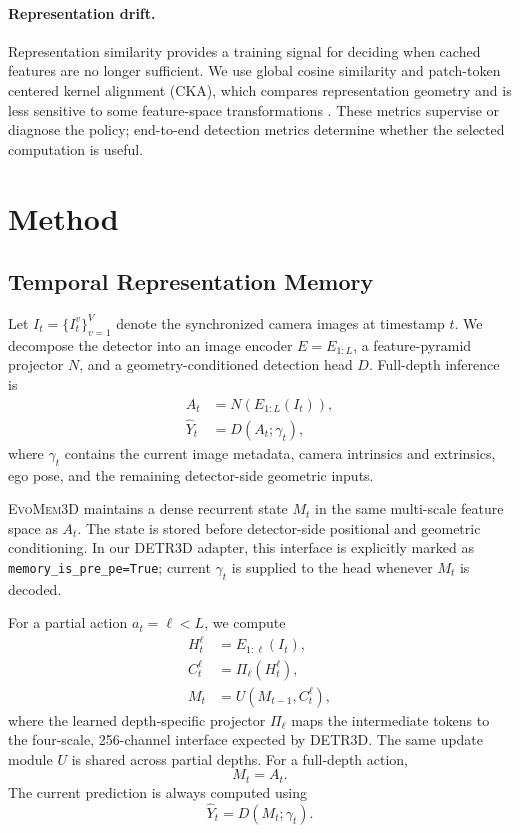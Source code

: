 \documentclass[10pt,twocolumn,letterpaper]{article}
\newcommand{\method}{\textsc{EvoMem3D}}
\begin{document}
\paragraph{Representation drift.}
Representation similarity provides a training signal for deciding when cached features are no longer sufficient. We use global cosine similarity and patch-token centered kernel alignment (CKA), which compares representation geometry and is less sensitive to some feature-space transformations \cite{kornblith2019cka}. These metrics supervise or diagnose the policy; end-to-end detection metrics determine whether the selected computation is useful.

\section{Method}
\label{sec:method}

\subsection{Temporal Representation Memory}

Let $I_t=\{I_t^v\}_{v=1}^{V}$ denote the synchronized camera images
at timestamp $t$. We decompose the detector into an image encoder
$E=E_{1:L}$, a feature-pyramid projector $N$, and a geometry-conditioned
detection head $D$. Full-depth inference is
\begin{align}
A_t &= N(E_{1:L}(I_t)),\\
\widehat{Y}_t &= D(A_t;\gamma_t),
\end{align}
where $\gamma_t$ contains the current image metadata, camera
intrinsics and extrinsics, ego pose, and the remaining detector-side
geometric inputs.

\method{} maintains a dense recurrent state $M_t$ in the same
multi-scale feature space as $A_t$. The state is stored before
detector-side positional and geometric conditioning. In our DETR3D
adapter, this interface is explicitly marked as
\texttt{memory\_is\_pre\_pe=True}; current $\gamma_t$ is supplied to
the head whenever $M_t$ is decoded.

For a partial action $a_t=\ell<L$, we compute
\begin{align}
H_t^\ell &= E_{1:\ell}(I_t),\\
C_t^\ell &= \Pi_\ell(H_t^\ell),\\
M_t &= U(M_{t-1},C_t^\ell),
\end{align}
where the learned depth-specific projector $\Pi_\ell$ maps the
intermediate tokens to the four-scale, 256-channel interface expected
by DETR3D. The same update module $U$ is shared across partial depths.
For a full-depth action,
\begin{equation}
M_t=A_t.
\end{equation}
The current prediction is always computed using
\begin{equation}
\widehat{Y}_t=D(M_t;\gamma_t).
\end{equation}
\end{document}
